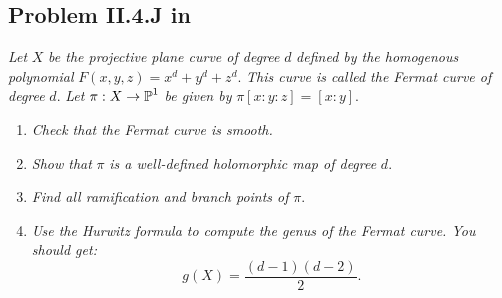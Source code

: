 \documentclass{article}
\begin{document}
\subsection*{Problem II.4.J in \cite{Mir}}
\textit{Let} $X$ \textit{be the projective plane curve of degree} $d$ \textit{defined by the homogenous
polynomial} $F(x,y,z) = x^d + y^d + z^d$. \textit{This curve is called the Fermat curve of degree}
$d$. \textit{Let} $\pi:X \to \operatorname{\mathbb{P}}^1$ \textit{be given by} $\pi[x:y:z] = [x:y]$.
\begin{enumerate}
\item \textit{Check that the Fermat curve is smooth.}
\item \textit{Show that} $\pi$ \textit{is a well-defined holomorphic map of degree} $d$.
\item \textit{Find all ramification and branch points of} $\pi$.
\item \textit{Use the Hurwitz formula to compute the genus of the Fermat curve. You should get:}
\[	g(X) = \frac{(d-1)(d-2)}{2}.	\]
\end{enumerate}
\end{document}

